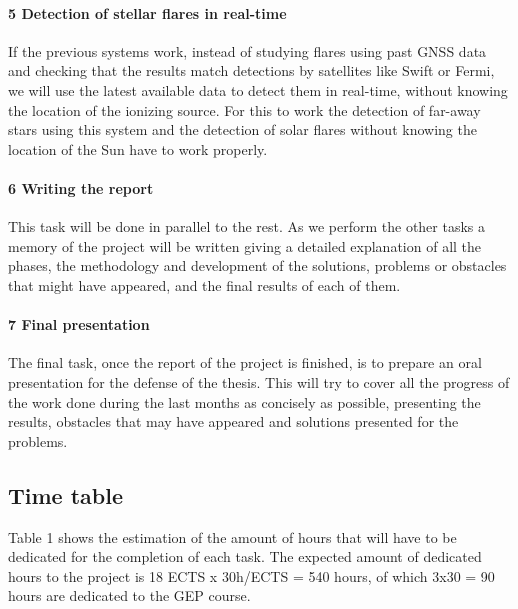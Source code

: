 \paragraph{5 Detection of stellar flares in real-time}

If the previous systems work, instead of studying flares using past GNSS data and checking that the results match detections by satellites like Swift or Fermi, we will use the latest available data to detect them in real-time, without knowing the location of the ionizing source. For this to work the detection of far-away stars using this system and the detection of solar flares without knowing the location of the Sun have to work properly.

\paragraph{6 Writing the report}

This task will be done in parallel to the rest. As we perform the other tasks a memory of the project will be written giving a detailed explanation of all the phases, the methodology and development of the solutions, problems or obstacles that might have appeared, and the final results of each of them. 

\paragraph{7 Final presentation}

The final task, once the report of the project is finished, is to prepare an oral presentation for the defense of the thesis. This will try to cover all the progress of the work done during the last months as concisely as possible, presenting the results, obstacles that may have appeared and solutions presented for the problems.

\subsection{Time table}

Table 1 shows the estimation of the amount of hours that will have to be dedicated for the completion of each task. The expected amount of dedicated hours to the project is 18 ECTS x 30h/ECTS = 540 hours, of which 3x30 = 90 hours are dedicated to the GEP course.

